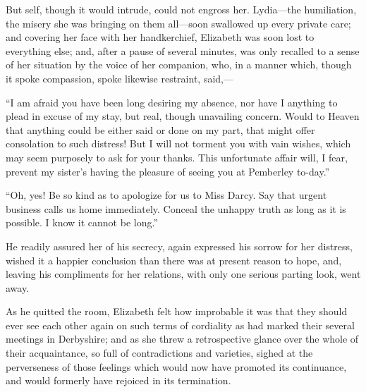 \documentclass[10pt]{book}
\begin{document}
   But self, though it would intrude, could not engross her. Lydia—the
humiliation, the misery she was bringing on them all—soon swallowed up
every private care; and covering her face with her handkerchief,
Elizabeth was soon lost to everything else; and, after a pause of
several minutes, was only recalled to a sense of her situation by the
voice of her companion, who, in a manner which, though it spoke
compassion, spoke likewise restraint, said,—
  

   “I am afraid you have been long desiring my absence, nor have I anything
to plead in excuse of my stay, but real, though unavailing concern.
Would to Heaven that anything could be either said or done on my part,
that might offer consolation to such distress! But I will not torment
you with vain wishes, which may seem purposely to ask for your thanks.
This unfortunate affair will, I fear, prevent my sister’s having the
pleasure of seeing you at Pemberley to-day.”
  

   “Oh, yes! Be so kind as to apologize for us to Miss Darcy. Say that
urgent business calls us home immediately. Conceal the unhappy truth as
long as it is possible. I know it cannot be long.”
  

   He readily assured her of his secrecy, again expressed
   his sorrow for
her distress, wished it a happier conclusion than there was at present
reason to hope, and, leaving his compliments for her relations, with
only one serious parting look, went away.
  

   As he quitted the room, Elizabeth felt how improbable it was that they
should ever see each other again on such terms of cordiality as had
marked their several meetings in Derbyshire; and as she threw a
retrospective glance over the whole of their acquaintance, so full of
contradictions and varieties, sighed at the perverseness of those
feelings which would now have promoted its continuance, and would
formerly have rejoiced in its termination.
  
\end{document}
